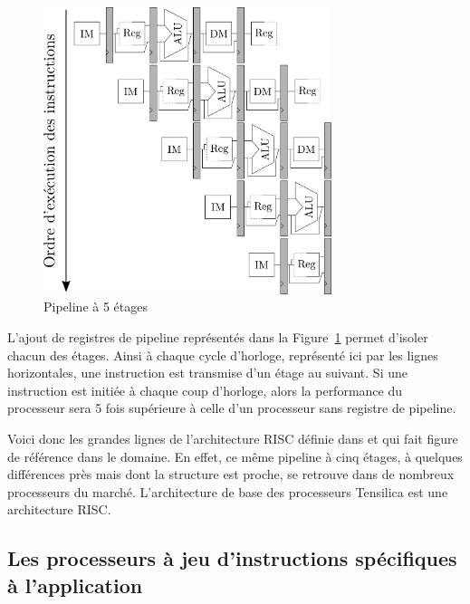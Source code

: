 \begin{figure}[t]
\centering
\includegraphics[width=0.75\textwidth]{main/ch3_fig/pipelines}
\caption{Pipeline à 5 étages}
\label{fig:pipelines}
\end{figure}


L'ajout de registres de pipeline représentés dans la Figure~\ref{fig:pipelines} permet d'isoler chacun des étages. Ainsi à chaque cycle d'horloge, représenté ici par les lignes horizontales, une instruction est transmise d'un étage au suivant. Si une instruction est initiée à chaque coup d'horloge, alors la performance du processeur sera 5 fois supérieure à celle d'un processeur sans registre de pipeline.

Voici donc les grandes lignes de l'architecture RISC définie dans \cite{hennessy2011computer} et qui fait figure de référence dans le domaine. En effet, ce même pipeline à cinq étages, à quelques différences près mais dont la structure est proche, se retrouve dans de nombreux processeurs du marché. L'architecture de base des processeurs Tensilica est une architecture RISC.

\subsection{Les processeurs à jeu d'instructions spécifiques à l'application}

